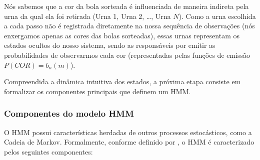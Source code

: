 \documentclass[
    12pt,                %
    openright,           %
    oneside,             %
    a4paper,             %
    english,             %
    brazil               %
]{abntex2}
\begin{document}
Nós sabemos que a cor da bola sorteada é influenciada de maneira indireta pela urna da qual ela foi retirada (Urna 1, Urna 2, \dots, Urna $N$). Como a urna escolhida a 
cada passo não é registrada diretamente na nossa sequência de observações (nós enxergamos apenas as cores das bolas sorteadas), essas urnas representam os estados 
ocultos do nosso sistema, sendo as responsáveis por emitir as probabilidades de observarmos cada cor (representadas pelas funções de emissão $P(COR) = b_n(m)$).

Compreendida a dinâmica intuitiva dos estados, a próxima etapa consiste em formalizar os componentes principais que
definem um HMM.

\subsubsection{Componentes do modelo HMM}

O HMM possui características herdadas de outros processos estocásticos, como a Cadeia de Markov.
Formalmente, conforme definido por , o HMM é caracterizado pelos seguintes componentes:
\end{document}
